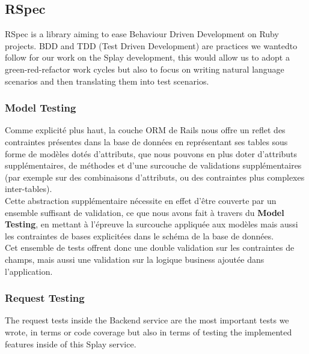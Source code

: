 \documentclass{eplmastersthesis}
\begin{document}
      \subsection{RSpec}

        RSpec \cite{rspec} is a library aiming to ease Behaviour Driven
        Development on Ruby projects. BDD and TDD (Test Driven Development) are
        practices we wantedto follow for our work on the Splay development,
        this would allow us to adopt a green-red-refactor work cycles but also
        to focus on writing natural language scenarios and then translating
        them into test scenarios.

        \subsubsection{Model Testing}

          Comme explicité plus haut, la couche ORM de Rails nous offre un
          reflet des contraintes présentes dans la base de données en représentant
          ses tables sous forme de modèles dotés d'attributs, que nous pouvons en
          plus doter d'attributs supplémentaires, de méthodes et d'une surcouche
          de validations supplémentaires (par exemple sur des combinaisons d'attributs,
          ou des contraintes plus complexes inter-tables).\\

          Cette abstraction supplémentaire nécessite en effet d'être couverte par
          un ensemble suffisant de validation, ce que nous avons fait à travers
          du \textbf{Model Testing}, en mettant à l'épreuve la surcouche appliquée
          aux modèles mais aussi les contraintes de bases explicitées dans le
          schéma de la base de données.\\

          Cet ensemble de tests offrent donc une double validation sur les contraintes
          de champs, mais aussi une validation sur la logique business ajoutée
          dans l'application.

        \subsubsection{Request Testing}

          The request tests inside the Backend service are the most important
          tests we wrote, in terms or code coverage but also in terms of
          testing the implemented features inside of this Splay service.\\
\end{document}
